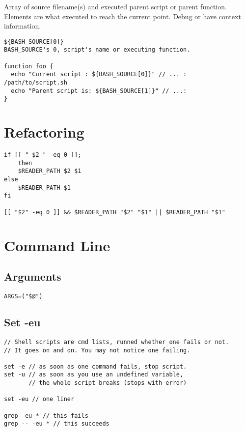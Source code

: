     Array of source filename(s) and executed parent script or parent function.
    Elements are what executed to reach the current point.
    Debug or have context information.

\begin{verbatim}
${BASH_SOURCE[0]}
BASH_SOURCE's 0, script's name or executing function.

function foo {
  echo "Current script : ${BASH_SOURCE[0]}" // ... : /path/to/script.sh
  echo "Parent script is: ${BASH_SOURCE[1]}" // ...: 
}
\end{verbatim}

\section{Refactoring}

\begin{verbatim}
if [[ " $2 " -eq 0 ]];
    then
    $READER_PATH $2 $1
else
    $READER_PATH $1
fi

[[ "$2" -eq 0 ]] && $READER_PATH "$2" "$1" || $READER_PATH "$1"
\end{verbatim}

\section{Command Line}

\subsection{Arguments}

\begin{verbatim}
ARGS=("$@")
\end{verbatim}

\subsection{Set -eu}

\begin{verbatim}
// Shell scripts are cmd lists, runned whether one fails or not.
// It goes on and on. You may not notice one failing. 

set -e // as soon as one command fails, stop script. 
set -u // as soon as you use an undefined variable, 
       // the whole script breaks (stops with error)

set -eu // one liner

grep -eu * // this fails
grep -- -eu * // this succeeds
\end{verbatim}

